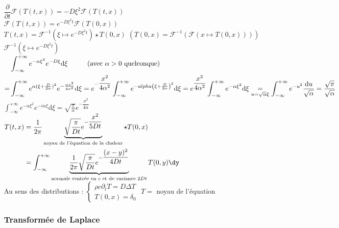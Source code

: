 \documentclass[12pt,a4paper]{article}
\begin{document}
\noindent$\dfrac\partial{\partial t}\mathcal F(T(t,x)) = -D\xi^2\mathcal F(T(t,x))$\\
$\mathcal F\left(T(t,x)\right) = e^{-D\xi^2t}\mathcal F(T(0,x))$\\

\noindent$T(t,x) = \mathcal F^{-1}\left(\xi\mapsto e^{-D\xi^2t}\right)\star T(0,x)$ \hspace{2cm} $\left(T(0,x) = \mathcal F^{-1}\left(\mathcal F\left(x\mapsto T(0,x)\right)\right)\right)$\\
$\mathcal F^{-1}\left(\xi\mapsto e^{-D\xi^2t}\right)$\\
$\begin{aligned}[t]
	&\displaystyle\int_{-\infty}^{+\infty}e^{-\alpha\xi^2}e^{-D\xi}\mathrm d\xi \hspace{1cm} \text{(avec $ \alpha >0$ quelconque)}\\
	=&\int_{-\infty}^{+\infty}e^{\alpha(\xi+\frac D{2\alpha})^2}e^{-\frac{\alpha x^2}{4\alpha^2}}\mathrm d\xi = e^{-\dfrac{x^2}{4\alpha^2}}\int_{-\infty}^{+\infty}e^{-alpha\left(\xi+\frac D{2\alpha}\right)^2}\mathrm d\xi = e^{\dfrac{x^2}{4\alpha^2}}\int_{-\infty}^{+\infty}e^{-\alpha\xi^2}\mathrm d\xi \underset{u=\sqrt\alpha\xi}= \int_{-\infty}^{+\infty}e^{-u^2}\dfrac{\mathrm du}{\sqrt\alpha} = \dfrac{\sqrt\pi}{\sqrt\alpha}
\end{aligned}$ \\

$\displaystyle\int_{-\infty}^{+\infty}e^{-\alpha\xi^2}e^{-i\alpha\xi}\mathrm d\xi = \sqrt{\frac\pi\alpha}e^{-\dfrac{x^2}{4\alpha}}$\\
$\begin{aligned}
	T(t,x) &= \dfrac1{2\pi}\underbrace{\sqrt{\dfrac\pi{Dt}}e^{-\dfrac{x^2}{5Dt}}}_{\text{noyau de l'équation de la chaleur}}\star T(0,x)\\
	&=\int_{-\infty}^{+\infty}\underbrace{\dfrac1{2\pi}\sqrt{\dfrac{\pi}{Dt}}e^{-\dfrac{(x-y)^2}{4Dt}}}_{\text{normale centrée en $c$ et de variance $2Dt$}}T(0,y)\dy
\end{aligned}$\\

Au sens des distributions : $\begin{cases}
	\rho c\partial_t T = D\Delta T \\
	T(0,x) = \delta_0
\end{cases}$ $T = $ noyau de l'équation

\subsubsection{Transformée de Laplace}
\end{document}
